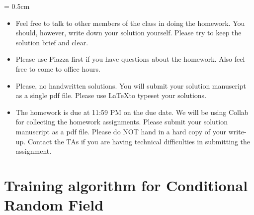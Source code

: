 
\usepackage{graphicx}
\usepackage{subfigure}
\usepackage{amsmath}
\usepackage{amssymb}
\usepackage{epsfig}
\usepackage{enumerate}
\usepackage{color}
\usepackage{algorithmic}
\usepackage{hyperref}


\sloppy
\parskip = 0.5cm

\newcommand{\ignore}[1]{}
\newcommand{\pp}{\noindent}
\newcommand{\ov}{\overline}
\newcommand{\bb}[1]{{\bf #1}}
\renewcommand{\labelitemii}{\tiny$\circ$}

\newcommand{\question}[1]{#1}%
%
\newcommand{\answer}[2]{{
\vspace{10pt} 
\color{red}{#2}
\vspace{10pt}
}
}
\newcommand{\comment}[1]{}


\oddsidemargin 0in
\evensidemargin 0in
\textwidth 6.5in
\topmargin -0.5in
\textheight 9.0in


\setlength{\unitlength}{1mm}

\thispagestyle{plain}
\newpage
{}

\begin{itemize}
\item Feel free to talk to other members of the class in doing the homework. You should, however,
write down your solution yourself.  Please try to keep the solution brief and clear.

\item Please use Piazza first if you have questions about the homework. Also feel free to come to office hours.

\item Please, no handwritten solutions. You will submit your solution manuscript as a single pdf file. Please use \LaTeX to typeset your solutions.

\item The homework is due at 11:59 PM on the due date. We will be using
Collab for collecting the homework assignments. Please submit your solution manuscript as a pdf file.  Please do NOT hand in a hard copy of your write-up.
Contact the TAs if you are having technical difficulties in 
submitting the assignment. 
\end{itemize}



\section{Training algorithm for Conditional Random Field} 

